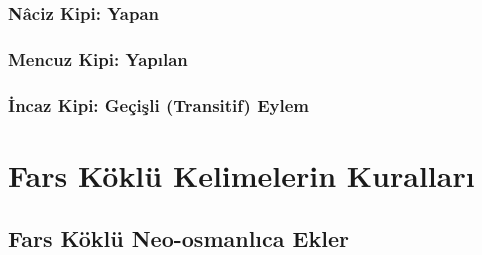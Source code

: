 \documentclass[a5paper,11pt, oneside, DIV11]{scrbook}
\begin{document}
\subsection{Nâciz Kipi: Yapan}

\subsection{Mencuz Kipi: Yapılan}

\subsection{İncaz Kipi: Geçişli (Transitif) Eylem}


\chapter{Fars Köklü Kelimelerin Kuralları}
\section{Fars Köklü Neo-osmanlıca Ekler}


\end{document}
